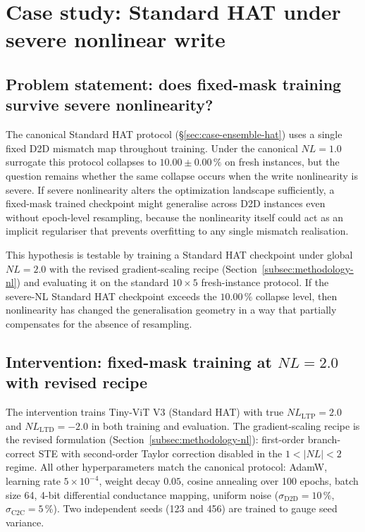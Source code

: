 \section{Case study: Standard HAT under severe nonlinear write}
\label{sec:case-severe-nl-standard}

\subsection{Problem statement: does fixed-mask training survive severe nonlinearity?}

The canonical Standard HAT protocol (\S\ref{sec:case-ensemble-hat}) uses a single fixed D2D mismatch map throughout training.  Under the canonical $NL=1.0$ surrogate this protocol collapses to $10.00\pm0.00\,\%$ on fresh instances, but the question remains whether the same collapse occurs when the write nonlinearity is severe.  If severe nonlinearity alters the optimization landscape sufficiently, a fixed-mask trained checkpoint might generalise across D2D instances even without epoch-level resampling, because the nonlinearity itself could act as an implicit regulariser that prevents overfitting to any single mismatch realisation.

This hypothesis is testable by training a Standard HAT checkpoint under global $NL=2.0$ with the revised gradient-scaling recipe (Section~\ref{subsec:methodology-nl}) and evaluating it on the standard $10\times5$ fresh-instance protocol.  If the severe-NL Standard HAT checkpoint exceeds the $10.00\,\%$ collapse level, then nonlinearity has changed the generalisation geometry in a way that partially compensates for the absence of resampling.

\subsection{Intervention: fixed-mask training at $NL=2.0$ with revised recipe}

The intervention trains Tiny-ViT V3 (Standard HAT) with true $NL_{\mathrm{LTP}}=2.0$ and $NL_{\mathrm{LTD}}=-2.0$ in both training and evaluation.  The gradient-scaling recipe is the revised formulation (Section~\ref{subsec:methodology-nl}): first-order branch-correct STE with second-order Taylor correction disabled in the $1<|NL|<2$ regime.  All other hyperparameters match the canonical protocol: AdamW, learning rate $5\times10^{-4}$, weight decay $0.05$, cosine annealing over 100 epochs, batch size 64, 4-bit differential conductance mapping, uniform noise ($\sigma_{\mathrm{D2D}}=10\,\%$, $\sigma_{\mathrm{C2C}}=5\,\%$).  Two independent seeds (123 and 456) are trained to gauge seed variance.

